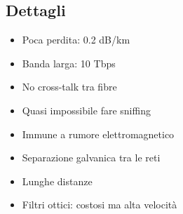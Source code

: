 \documentclass[8pt]{extarticle}
\begin{document}
\subsection{Dettagli}
\begin{itemize}
    \item Poca perdita: 0.2 dB/km
    \item Banda larga: 10 Tbps
    \item No cross-talk tra fibre
    \item Quasi impossibile fare sniffing
    \item Immune a rumore elettromagnetico
    \item Separazione galvanica tra le reti
    \item Lunghe distanze
    \item Filtri ottici: costosi ma alta velocità
\end{itemize}
\end{document}
